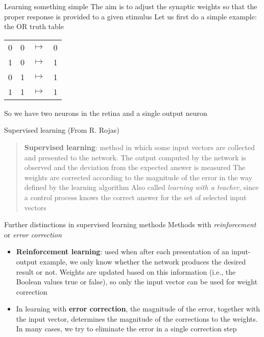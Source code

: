 \documentclass[aspectratio=169]{beamer}\usepackage[]{graphicx}\usepackage[]{xcolor}
\begin{document}
\begin{frame}{Learning something simple}
    The aim is to adjust the synaptic weights so that the proper response is provided to a given stimulus
    \vfill
    Let us first do a simple example: the OR truth table
    \begin{center}
        \begin{tabular}{cccc}
            0 & 0 & $\mapsto$ & 0 \\
            1 & 0 & $\mapsto$ & 1 \\
            0 & 1 & $\mapsto$ & 1 \\
            1 & 1 & $\mapsto$ & 1 \\
        \end{tabular}
    \end{center}
    So we have two neurons in the retina and a single output neuron
\end{frame}

\begin{frame}{Supervised learning}
    (From R. Rojas)
    \begin{quote}
    \textbf{Supervised learning}: method in which some input vectors are collected and presented to the network. The output computed by the network is observed and the deviation from the expected answer is measured
    \vskip0.5cm
    The weights are corrected according to the magnitude of the error in the way defined by the learning algorithm
    \vskip0.5cm
    Also called \emph{learning with a teacher}, since a control process knows the correct answer for the set of selected input vectors
    \end{quote}
\end{frame}

\begin{frame}{Further distinctions in supervised learning methods}
    Methods with \emph{reinforcement} or \emph{error correction} 
    \vfill
    \begin{itemize}
        \item \textbf{Reinforcement learning}: used when after each presentation of an input-output example, we only know whether the network produces the desired result or not. 
        Weights are updated based on this information (i.e., the Boolean values true or false), so only the input vector can be used for weight correction
        \vfill
        \item In learning with \textbf{error correction}, the
        magnitude of the error, together with the input vector, determines the magnitude of the corrections to the weights. In many cases, we try to eliminate the error in a single correction step
    \end{itemize}
\end{frame}
\end{document}
